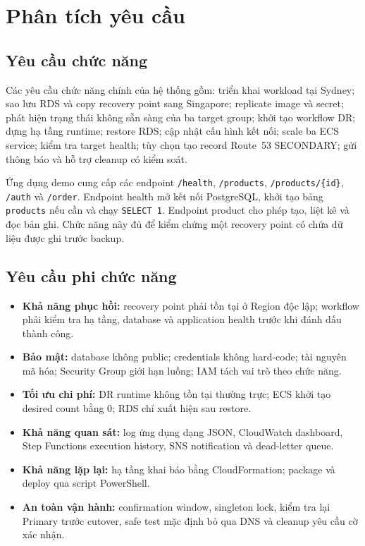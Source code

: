 \section{Phân tích yêu cầu}

\subsection{Yêu cầu chức năng}

Các yêu cầu chức năng chính của hệ thống gồm: triển khai workload tại Sydney; sao lưu RDS và copy recovery point sang Singapore; replicate image và secret; phát hiện trạng thái không sẵn sàng của ba target group; khởi tạo workflow DR; dựng hạ tầng runtime; restore RDS; cập nhật cấu hình kết nối; scale ba ECS service; kiểm tra target health; tùy chọn tạo record Route~53 SECONDARY; gửi thông báo và hỗ trợ cleanup có kiểm soát.

Ứng dụng demo cung cấp các endpoint \texttt{/health}, \texttt{/products}, \texttt{/products/\{id\}}, \texttt{/auth} và \texttt{/order}. Endpoint health mở kết nối PostgreSQL, khởi tạo bảng \texttt{products} nếu cần và chạy \texttt{SELECT 1}. Endpoint product cho phép tạo, liệt kê và đọc bản ghi. Chức năng này đủ để kiểm chứng một recovery point có chứa dữ liệu được ghi trước backup.

\subsection{Yêu cầu phi chức năng}

\begin{itemize}
  \item \textbf{Khả năng phục hồi:} recovery point phải tồn tại ở Region độc lập; workflow phải kiểm tra hạ tầng, database và application health trước khi đánh dấu thành công.
  \item \textbf{Bảo mật:} database không public; credentials không hard-code; tài nguyên mã hóa; Security Group giới hạn luồng; IAM tách vai trò theo chức năng.
  \item \textbf{Tối ưu chi phí:} DR runtime không tồn tại thường trực; ECS khởi tạo desired count bằng 0; RDS chỉ xuất hiện sau restore.
  \item \textbf{Khả năng quan sát:} log ứng dụng dạng JSON, CloudWatch dashboard, Step Functions execution history, SNS notification và dead-letter queue.
  \item \textbf{Khả năng lặp lại:} hạ tầng khai báo bằng CloudFormation; package và deploy qua script PowerShell.
  \item \textbf{An toàn vận hành:} confirmation window, singleton lock, kiểm tra lại Primary trước cutover, safe test mặc định bỏ qua DNS và cleanup yêu cầu cờ xác nhận.
\end{itemize}

